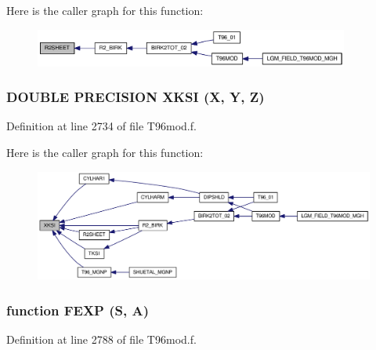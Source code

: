 Here is the caller graph for this function:\nopagebreak
\begin{figure}[H]
\begin{center}
\leavevmode
\includegraphics[width=293pt]{_t96mod_8f_d2c23a8a964ae249deaa1665da76803f_icgraph}
\end{center}
\end{figure}
\hypertarget{_t96mod_8f_34df9615369af608c58c50830a71bc2c}{
\subsubsection[{XKSI}]{\setlength{\rightskip}{0pt plus 5cm}DOUBLE PRECISION XKSI (X, \/  Y, \/  Z)}}
\label{_t96mod_8f_34df9615369af608c58c50830a71bc2c}




Definition at line 2734 of file T96mod.f.

Here is the caller graph for this function:\nopagebreak
\begin{figure}[H]
\begin{center}
\leavevmode
\includegraphics[width=353pt]{_t96mod_8f_34df9615369af608c58c50830a71bc2c_icgraph}
\end{center}
\end{figure}
\hypertarget{_t96mod_8f_de7e8858bac24c4e9ef3bbee7949e235}{
\subsubsection[{FEXP}]{\setlength{\rightskip}{0pt plus 5cm}function FEXP (S, \/  A)}}
\label{_t96mod_8f_de7e8858bac24c4e9ef3bbee7949e235}




Definition at line 2788 of file T96mod.f.

